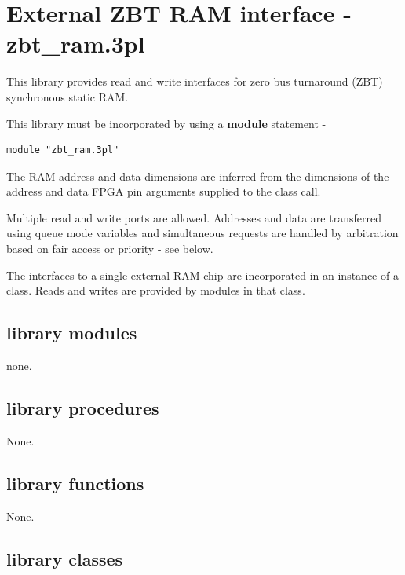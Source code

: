\pagebreak

\section{External ZBT RAM interface - zbt\_ram.3pl}

    This library provides read and write interfaces for zero bus turnaround
    (ZBT) synchronous static RAM.
    
    This library must be incorporated by using a {\bf module} statement -
    \begin{lstlisting}[gobble=4, language=threepl]
       module "zbt_ram.3pl"
    \end{lstlisting}
    
    
    The RAM address and data dimensions are inferred from the dimensions
    of the address and data FPGA pin arguments supplied to the class
    call.

    Multiple read and write ports are allowed. Addresses and data are
    transferred using queue mode variables and simultaneous requests are handled
    by arbitration based on fair access or priority - see below.
    
    The interfaces to a single external RAM chip are incorporated in
    an instance of a class. Reads and writes are provided by modules in
    that class.


    

    \subsection{library modules}
    
        none.

    \subsection{library procedures}
    
        None.

    \subsection{library functions}
    
        None.


    \subsection{library classes}
    
